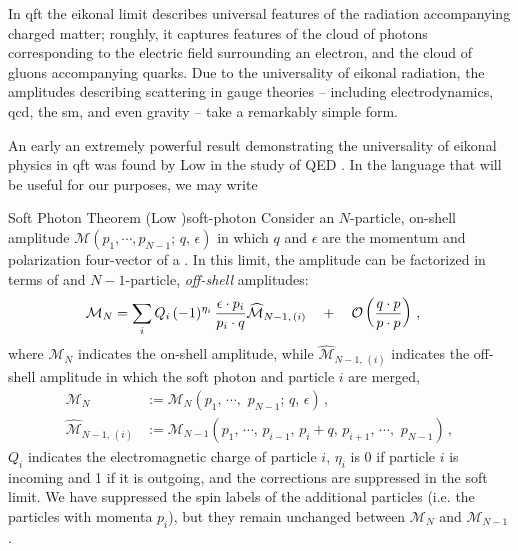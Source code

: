 In \gls{qft} the eikonal limit describes universal features of the radiation accompanying charged matter;
%
roughly, it captures features of the cloud of photons corresponding to the electric field surrounding an electron, and the cloud of gluons accompanying quarks.
%
Due to the universality of eikonal radiation, the amplitudes describing scattering in gauge theories -- including electrodynamics, \gls{qcd}, the \gls{sm}, and even gravity -- take a remarkably simple form.

An early an extremely powerful result demonstrating the universality of eikonal physics in \gls{qft} was found by Low in the study of QED \cite{}.
%
In the language that will be useful for our purposes, we may write

\begin{theorembox}{Soft Photon Theorem (Low \cite{})}{soft-photon}
    Consider an \(N\)-particle, on-shell amplitude \(\mathcal{M}(p_1, \cdots, p_{N-1};\,q,\,\epsilon)\) in which \(q\) and \(\epsilon\) are the momentum and polarization four-vector of a .
    In this limit, the amplitude can be factorized in terms of  and \(N-1\)-particle, \textit{off-shell} amplitudes:
    \begin{equation}
    \begin{aligned}
        \mathcal{M}_N
        &=
        \sum_{i}
        Q_i
        \,
        (-1)^{\eta_i}
        \,
        \frac{\epsilon \cdot p_i}{p_i \cdot q}
        \widehat{\mathcal{M}}_{N-1,\,(i)}
        \quad
        +
        \quad
        \mathcal{O}\left(\frac{q\cdot p}{p \cdot p}\right)
        \,,
    \end{aligned}
    \end{equation}
where \(\mathcal{M}_N\) indicates the on-shell amplitude, while \(\widehat{\mathcal{M}}_{N-1,\,(i)}\) indicates the off-shell amplitude in which the soft photon and particle \(i\) are merged,
    \begin{align}
        \mathcal{M}_N
        &:=
        \mathcal{M}_N(p_1,\,\cdots,\,\,p_{N-1};\,q,\,\epsilon)
        \,,
        \\
        \widehat{\mathcal{M}}_{N-1,\,(i)}
        &:=
        \mathcal{M}_{N-1}(
            p_1,\,\cdots,\,
            p_{i-1},\,
            p_i + q,\,
            p_{i+1},\,
            \cdots,\,\,p_{N-1}
        )
        \,,
    \end{align}
    \(Q_i\) indicates the electromagnetic charge of particle \(i\), \(\eta_i\) is 0 if particle \(i\) is incoming and 1 if it is outgoing, and the corrections are suppressed in the soft limit.
    We have suppressed the spin labels of the additional particles (i.e. the particles with momenta \(p_i\)), but they remain unchanged between \(\mathcal{M}_N\) and \(\mathcal{M}_{N-1}\).
\end{theorembox}

